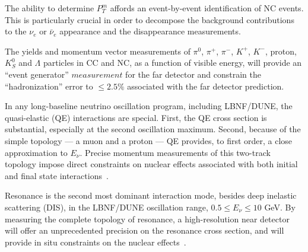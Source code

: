 The ability to determine {\bf{$P^m_T$}} affords an event-by-event 
identification of NC events. This is particularly crucial in order to decompose the background contributions to 
the $\nu_e$ or $\bar \nu_e$ appearance and the disappearance measurements. 


The yields and momentum vector measurements of %
$\pi^0$, $\pi^+$, $\pi^-$, $K^+$, $K^-$, proton, $K^0_S$ and $\Lambda$ particles in CC and NC, as a function of 
visible energy, will provide an ``event generator'' $measurement$ for the far detector and constrain the 
``hadronization'' error to $\leq 2.5\%$ associated with the far detector prediction. 



In any long-baseline neutrino oscillation program, including LBNF/DUNE, 
the quasi-elastic (QE) interactions are special. First, the QE cross section is substantial, especially at the second oscillation maximum. 
Second, because of the simple topology --- a muon and a proton --- QE provides, to  first order, 
a close approximation to $E_\nu$.  
Precise momentum measurements  of this two-track topology impose direct constraints on nuclear effects 
associated with both initial and final state interactions~\cite{near-detector-QE}. 

Resonance is the second most dominant interaction mode, besides deep inelastic scattering (DIS),  
in the LBNF/DUNE oscillation range, $0.5 \leq E_\nu \leq 10$ GeV.
 By measuring the complete 
topology of resonance, a high-resolution near detector 
will offer an unprecedented precision on the resonance cross section, and will provide in situ constraints on the 
nuclear effects~\cite{near-detector-RES}.  


